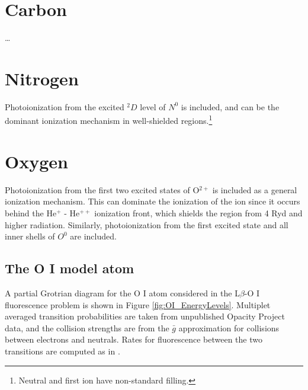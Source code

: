 \section{Carbon}

\dots

\section{Nitrogen}

Photoionization from the excited $^2D$
level of $N^0$ is included, and can be the dominant ionization mechanism in
well-shielded regions.\footnote{Neutral and first ion have non-standard filling.}

\section{Oxygen}

Photoionization from the first two excited states of O$^{2+}$ is included
as a general ionization mechanism.  This can dominate the ionization of
the ion since it occurs behind the He$^+$ - He$^{++}$ ionization front, which shields
the region from 4 Ryd and higher radiation.   Similarly, photoionization
from the first excited state and all inner shells of $O^0$ are included.

\subsection{The O I model atom}

A partial Grotrian diagram for the O I atom considered in the L$\beta$-O I
fluorescence problem is shown in Figure \ref{fig:OI_EnergyLevels}.  Multiplet averaged transition
probabilities are taken from unpublished Opacity Project data, and the
collision strengths are from the $\bar g$
 approximation for collisions between electrons and neutrals.  Rates
for fluorescence between the two transitions are computed as in
\citet{Netzer1985}.

